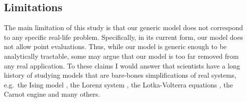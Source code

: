 \subsection{Limitations}\label{subsec:limitations}
The main limitation of this study is that our generic model does not
correspond to any specific real-life problem. Specifically, in its
current form, our model does not allow point evaluations. Thus, while
our model is generic enough to be analytically tractable, some may
argue that our model is too far removed from any real application. To
these claims I would answer that scientists have a long history of
studying models that are bare-bones simplifications of real systems,
e.g.~the Ising model \cite{cipra1987}, the Lorenz system \cite{brin},
the Lotka-Volterra equations \cite{logan2006}, the Carnot engine
\cite{kardar2007} and many others.
